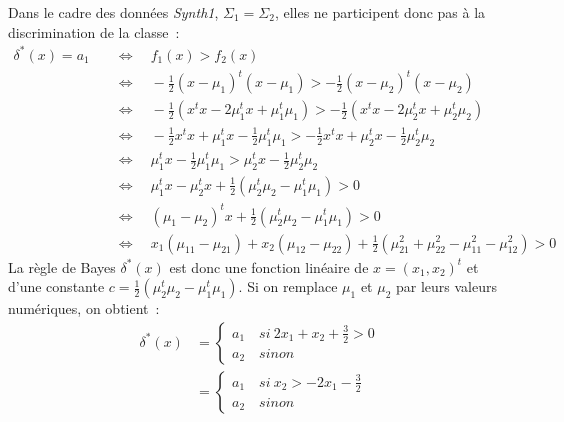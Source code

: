 \documentclass[a4paper,10pt]{report}
\begin{document}
Dans le cadre des données \textit{Synth1}, $ \Sigma_{1} = \Sigma_{2} $, elles ne participent donc pas à la discrimination de la classe~:
\begin{align*}
\delta^*(x) = a_1 \quad 
&\Leftrightarrow \quad f_1(x) > f_2(x) \\
&\Leftrightarrow \quad -\frac{1}{2} (x - \mu_1)^t (x - \mu_1) > -\frac{1}{2} (x - \mu_2)^t(x - \mu_2) \\
&\Leftrightarrow \quad -\frac{1}{2} \left( x^tx -2\mu_{1}^tx + \mu_{1}^t\mu_{1}  \right) > -\frac{1}{2} \left( x^tx -2\mu_{2}^tx + \mu_{2}^t\mu_{2}  \right) \\
&\Leftrightarrow \quad -\frac{1}{2}x^tx + \mu_{1}^tx -\frac{1}{2} \mu_{1}^t\mu_{1} > -\frac{1}{2}x^tx + \mu_{2}^tx -\frac{1}{2} \mu_{2}^t\mu_{2} \\
&\Leftrightarrow \quad \mu_{1}^tx -\frac{1}{2} \mu_{1}^t\mu_{1} > \mu_{2}^tx -\frac{1}{2} \mu_{2}^t\mu_{2} \\
&\Leftrightarrow \quad \mu_{1}^tx - \mu_{2}^tx + \frac{1}{2}( \mu_{2}^t\mu_{2} - \mu_{1}^t\mu_{1} )  >  0 \\
&\Leftrightarrow \quad (\mu_{1} - \mu_{2})^tx + \frac{1}{2}( \mu_{2}^t\mu_{2} - \mu_{1}^t\mu_{1} )   >  0 \\
&\Leftrightarrow \quad x_1(\mu_{11} - \mu_{21}) + x_2(\mu_{12} - \mu_{22}) + \frac{1}{2} (\mu_{21}^2 + \mu_{22}^2 - \mu_{11}^2 - \mu_{12}^2) >  0
\end{align*}
La règle de Bayes $\delta^*(x)$ est donc une fonction linéaire de $x = (x_1, x_2)^t$ et d'une constante $ c = \frac{1}{2}( \mu_{2}^t\mu_{2} - \mu_{1}^t\mu_{1} )$.
Si on remplace $\mu_{1}$ et $\mu_{2}$ par leurs valeurs numériques, on obtient~:
\begin{align*}
\delta^*(x) 
&=  \left\{ 
\begin{array}{l}
a_1 \quad si\ 2x_1 + x_2 + \frac{3}{2} > 0 \\
a_2 \quad sinon
\end{array} 	\right. \\
&=  \left\{ 
\begin{array}{l}
a_1 \quad si\ x_2 > -2x_1 -\frac{3}{2} \\
a_2 \quad sinon
\end{array} 	\right.
\end{align*}
\end{document}
